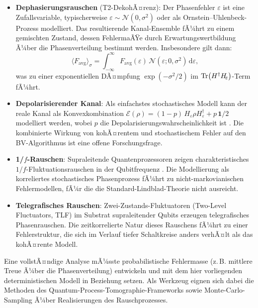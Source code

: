﻿\documentclass[11pt,a4paper]{article}
\theoremstyle{definition}
\newcommand{\eps}{\varepsilon}
\newcommand{\Heps}{H_{\!\varepsilon}}
\newcommand{\Fav}{F_{\!\mathrm{avg}}}
\begin{document}
\begin{itemize}
  \item \textbf{Dephasierungsrauschen} (T2-DekohÃ¤renz): Der Phasenfehler $\eps$
        ist eine Zufallsvariable, typischerweise $\eps\sim\mathcal{N}(0,\sigma^2)$
        oder als Ornstein--Uhlenbeck-Prozess modelliert.  Das resultierende
        Kanal-Ensemble fÃ¼hrt zu einem gemischten Zustand, dessen FehlermaÃŸe
        durch Erwartungswertbildung Ã¼ber die Phasenverteilung bestimmt werden.
        Insbesondere gilt dann:
        \[
          \langle\Fav\rangle_\sigma = \int_{-\infty}^{\infty}
          \Fav(\eps)\,\mathcal{N}(\eps;0,\sigma^2)\,\mathrm{d}\eps,
        \]
        was zu einer exponentiellen DÃ¤mpfung $\exp(-\sigma^2/2)$ im
        $\Tr(H^\dagger\Heps)$-Term fÃ¼hrt.

  \item \textbf{Depolarisierender Kanal}: Als einfachstes stochastisches Modell
        kann der reale Kanal als Konvexkombination
        $\mathcal{E}(\rho) = (1-p)\,\Heps\rho\Heps^\dagger + p\,\mathbf{1}/2$
        modelliert werden, wobei $p$ die Depolarisierungswahrscheinlichkeit
        ist \cite{Nielsen2000}.  Die kombinierte Wirkung von kohÃ¤rentem und
        stochastischem Fehler auf den BV-Algorithmus ist eine offene
        Forschungsfrage.

  \item \textbf{1/$f$-Rauschen}: Supraleitende Quantenprozessoren zeigen
        charakteristisches $1/f$-Fluktua\-tionsrauschen in der Qubitfrequenz
        \cite{Bylander2011}.  Die Modellierung als korreliertes stochastisches
        Phasenprozess fÃ¼hrt zu nicht-markovianischen Fehlermodellen, fÃ¼r die
        die Standard-Lindblad-Theorie nicht ausreicht.

  \item \textbf{Telegrafisches Rauschen}: Zwei-Zustands-Fluktuatoren
        (Two-Level Fluctuators, TLF) im Substrat supraleitender Qubits
        erzeugen telegrafisches Phasenrauschen.  Die zeitkorrelierte Natur
        dieses Rauschens fÃ¼hrt zu einer Fehlerstruktur, die sich im Verlauf
        tiefer Schaltkreise anders verhÃ¤lt als das kohÃ¤rente Modell.
\end{itemize}

Eine vollstÃ¤ndige Analyse mÃ¼sste probabilistische Fehlermasse
(z.\,B. mittlere Treue Ã¼ber die Phasenverteilung) entwickeln und mit
dem hier vorliegenden deterministischen Modell in Beziehung setzen.
Als Werkzeug eignen sich dabei die Methoden des
Quantum-Process-Tomographie-Frameworks \cite{Chuang1997} sowie
Monte-Carlo-Sampling Ã¼ber Realisierungen des Rauschprozesses.
\end{document}
